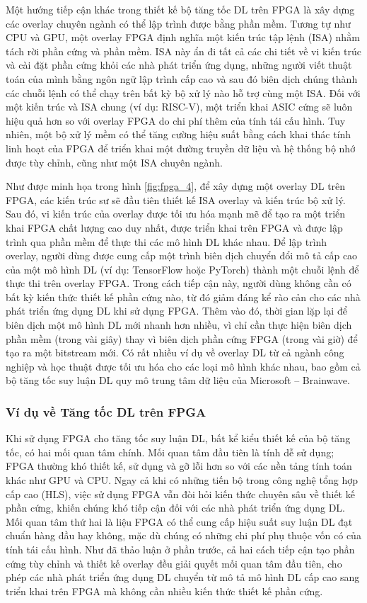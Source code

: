 \documentclass[a4paper]{article}
\begin{document}
    Một hướng tiếp cận khác trong thiết kế bộ tăng tốc DL trên FPGA là xây dựng các overlay chuyên ngành có thể lập trình được bằng phần mềm. Tương tự như CPU và GPU, một overlay FPGA định nghĩa một kiến trúc tập lệnh (ISA) nhằm tách rời phần cứng và phần mềm. ISA này ẩn đi tất cả các chi tiết về vi kiến trúc và cài đặt phần cứng khỏi các nhà phát triển ứng dụng, những người viết thuật toán của mình bằng ngôn ngữ lập trình cấp cao và sau đó biên dịch chúng thành các chuỗi lệnh có thể chạy trên bất kỳ bộ xử lý nào hỗ trợ cùng một ISA. Đối với một kiến trúc và ISA chung (ví dụ: RISC-V), một triển khai ASIC cứng sẽ luôn hiệu quả hơn so với overlay FPGA do chi phí thêm của tính tái cấu hình. Tuy nhiên, một bộ xử lý mềm có thể tăng cường hiệu suất bằng cách khai thác tính linh hoạt của FPGA để triển khai một đường truyền dữ liệu và hệ thống bộ nhớ được tùy chỉnh, cũng như một ISA chuyên ngành.
    
    Như được minh họa trong hình \ref{fig:fpga_4}, để xây dựng một overlay DL trên FPGA, các kiến trúc sư sẽ đầu tiên thiết kế ISA overlay và kiến trúc bộ xử lý. Sau đó, vi kiến trúc của overlay được tối ưu hóa mạnh mẽ để tạo ra một triển khai FPGA chất lượng cao duy nhất, được triển khai trên FPGA và được lập trình qua phần mềm để thực thi các mô hình DL khác nhau. Để lập trình overlay, người dùng được cung cấp một trình biên dịch chuyển đổi mô tả cấp cao của một mô hình DL (ví dụ: TensorFlow hoặc PyTorch) thành một chuỗi lệnh để thực thi trên overlay FPGA. Trong cách tiếp cận này, người dùng không cần có bất kỳ kiến thức thiết kế phần cứng nào, từ đó giảm đáng kể rào cản cho các nhà phát triển ứng dụng DL khi sử dụng FPGA. Thêm vào đó, thời gian lặp lại để biên dịch một mô hình DL mới nhanh hơn nhiều, vì chỉ cần thực hiện biên dịch phần mềm (trong vài giây) thay vì biên dịch phần cứng FPGA (trong vài giờ) để tạo ra một bitstream mới. Có rất nhiều ví dụ về overlay DL từ cả ngành công nghiệp và học thuật được tối ưu hóa cho các loại mô hình khác nhau, bao gồm cả bộ tăng tốc suy luận DL quy mô trung tâm dữ liệu của Microsoft – Brainwave.
\subsubsection{Ví dụ về Tăng tốc DL trên FPGA}
    Khi sử dụng FPGA cho tăng tốc suy luận DL, bất kể kiểu thiết kế của bộ tăng tốc, có hai mối quan tâm chính. Mối quan tâm đầu tiên là tính dễ sử dụng; FPGA thường khó thiết kế, sử dụng và gỡ lỗi hơn so với các nền tảng tính toán khác như GPU và CPU. Ngay cả khi có những tiến bộ trong công nghệ tổng hợp cấp cao (HLS), việc sử dụng FPGA vẫn đòi hỏi kiến thức chuyên sâu về thiết kế phần cứng, khiến chúng khó tiếp cận đối với các nhà phát triển ứng dụng DL. Mối quan tâm thứ hai là liệu FPGA có thể cung cấp hiệu suất suy luận DL đạt chuẩn hàng đầu hay không, mặc dù chúng có những chi phí phụ thuộc vốn có của tính tái cấu hình. Như đã thảo luận ở phần trước, cả hai cách tiếp cận tạo phần cứng tùy chỉnh và thiết kế overlay đều giải quyết mối quan tâm đầu tiên, cho phép các nhà phát triển ứng dụng DL chuyển từ mô tả mô hình DL cấp cao sang triển khai trên FPGA mà không cần nhiều kiến thức thiết kế phần cứng.
\end{document}
